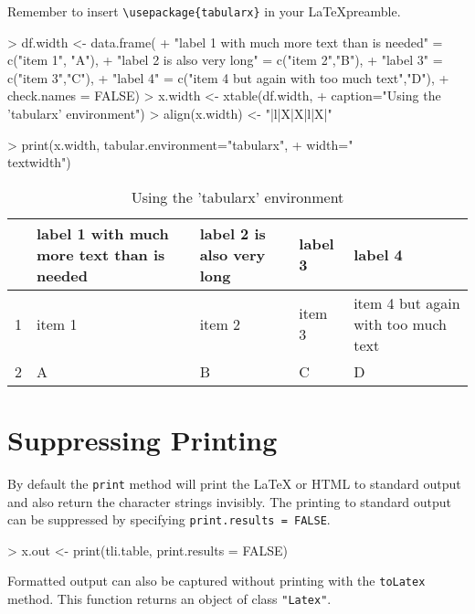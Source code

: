 \documentclass[letterpaper]{article}
\begin{document}
Remember to insert \verb|\usepackage{tabularx}| in your \LaTeX preamble.

\begin{Schunk}
\begin{Sinput}
> df.width <- data.frame(
+   "label 1 with much more text than is needed" = c("item 1", "A"),
+   "label 2 is also very long" = c("item 2","B"),
+   "label 3" = c("item 3","C"),
+   "label 4" = c("item 4 but again with too much text","D"),
+   check.names = FALSE)
> x.width <- xtable(df.width,
+   caption="Using the 'tabularx' environment")
> align(x.width) <- "|l|X|X|l|X|"
\end{Sinput}
\end{Schunk}

\begin{Schunk}
\begin{Sinput}
> print(x.width, tabular.environment="tabularx",
+   width="\\textwidth")
\end{Sinput}
% latex table generated in R 3.1.1 by xtable 1.7-3 package
% 
\begin{table}[ht]
\centering
\begin{tabularx}{\textwidth}{|l|X|X|l|X|}
  \hline
 & label 1 with much more text than is needed & label 2 is also very long & label 3 & label 4 \\ 
  \hline
1 & item 1 & item 2 & item 3 & item 4 but again with too much text \\ 
  2 & A & B & C & D \\ 
   \hline
\end{tabularx}
\caption{Using the 'tabularx' environment} 
\end{table}\end{Schunk}

\section{Suppressing Printing}
By default the {\tt print} method will print the LaTeX or HTML to standard
output and also return the character strings invisibly.  The printing to
standard output can be suppressed by specifying {\tt print.results = FALSE}.

\begin{Schunk}
\begin{Sinput}
> x.out <- print(tli.table, print.results = FALSE)
\end{Sinput}
\end{Schunk}

Formatted output can also be captured without printing with the
{\tt toLatex} method.  This function returns an object of class
{\tt "Latex"}.
\end{document}
